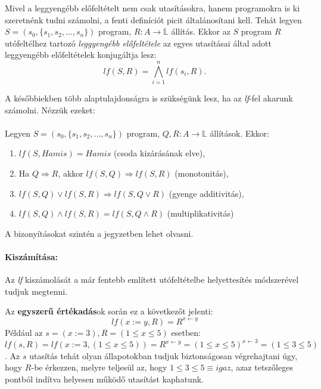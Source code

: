 \documentclass[12pt]{article}
\newcommand{\sprog}{$S = (s_0, \{s_1, s_2, \dots, s_n\})$ }
\begin{document}
\par Mivel a leggyengébb előfeltételt nem csak utasításokra, hanem programokra is ki szeretnénk tudni számolni, a fenti definíciót picit általánosítani kell. Tehát legyen \sprog program, $R: A \rightarrow \mathbb{L}$ állítás. Ekkor az $S$ program $R$ utófeltélhez tartozó \textit{leggyengébb előfeltétele} az egyes utasításai által adott leggyengébb előfeltételek konjugáltja lesz:
$$ lf(S, R) = \bigwedge_{i=1}^n lf(s_i, R). $$


A későbbiekben több alaptulajdonságra is szükségünk lesz, ha az \textit{lf}-fel akarunk számolni. Nézzük ezeket:
\paragraph{}
Legyen \sprog program, $Q,R: A \rightarrow \mathbb{L}$ állítások. Ekkor:
\begin{enumerate}
	\item $lf(S, Hamis) = Hamis$ (csoda kizárásának elve),
	\item Ha $Q \Rightarrow R$, akkor $lf(S,Q) \Rightarrow lf(S,R)$ (monotonitás),
	\item $lf(S,Q) \lor lf(S,R) \Rightarrow lf(S, Q\lor R)$ (gyenge additivitás),
	\item $lf(S,Q) \land lf(S,R) = lf(S, Q\land R)$ (multiplikativitás)
\end{enumerate}
A bizonyításokat szintén a jegyzetben lehet olvasni.
\paragraph{Kiszámítása:}
Az \textit{lf} kiszámolását a már fentebb említett utófeltételbe helyettesítés módszerével tudjuk megtenni.

Az \textbf{egyszerű értékadás}ok során ez a következőt jelenti:
$$lf(x := y, R) = R^{x \leftarrow y } $$
Például az $s = (x := 3), R = (1 \le x \le 5)$ esetben:\\
$lf(s, R) = lf(x:=3, (1 \le x \le 5)) = R^{x \leftarrow y} = (1 \le x \le 5)^{x \leftarrow 3} = (1 \le 3 \le 5)$.
Az $s$ utasítás tehát olyan állapotokban tudjuk biztonságosan végrehajtani úgy, hogy $R$-be érkezzen, melyre teljesül az, hogy $1 \le 3 \le 5 \equiv igaz$, azaz tetszőleges pontból indítva helyesen működő utasítást kaphatunk.
\end{document}
